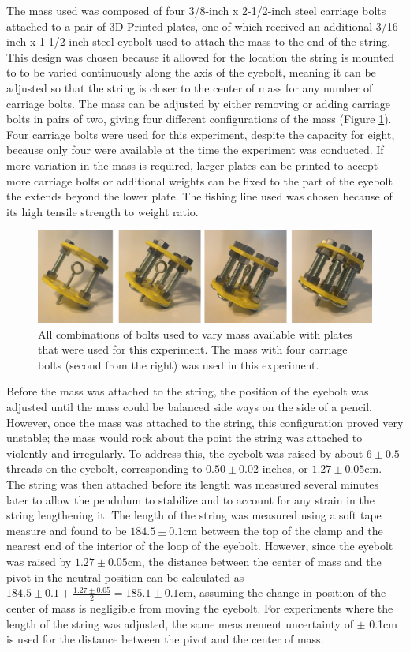 \documentclass[11pt]{article}
\begin{document}
        The mass used was composed of four 3/8-inch x 2-1/2-inch steel carriage bolts attached to a pair of 3D-Printed plates, one of which received an additional 3/16-inch x 1-1/2-inch steel eyebolt used to attach the mass to the end of the string. This design was chosen because it allowed for the location the string is mounted to to be varied continuously along the axis of the eyebolt, meaning it can be adjusted so that the string is closer to the center of mass for any number of carriage bolts. The mass can be adjusted by either removing or adding carriage bolts in pairs of two, giving four different configurations of the mass (Figure \ref{fig:masses}). Four carriage bolts were used for this experiment, despite the capacity for eight, because only four were available at the time the experiment was conducted. If more variation in the mass is required, larger plates can be printed to accept more carriage bolts or additional weights can be fixed to the part of the eyebolt the extends beyond the lower plate. The fishing line used was chosen because of its high tensile strength to weight ratio. 

        \begin{figure}[H]
            \centering\includegraphics[width = 0.75\linewidth]{allMasses.PNG}
            \caption{All combinations of bolts used to vary mass available with plates that were used for this experiment. The mass with four carriage bolts (second from the right) was used in this experiment.}
            \label{fig:masses}
        \end{figure}

        Before the mass was attached to the string, the position of the eyebolt was adjusted until the mass could be balanced side ways on the side of a pencil. However, once the mass was attached to the string, this configuration proved very unstable; the mass would rock about the point the string was attached to violently and irregularly. To address this, the eyebolt was raised by about $6 \pm 0.5$ threads on the eyebolt, corresponding to $0.50 \pm 0.02$ inches, or $1.27 \pm 0.05$cm. The string was then attached before its length was measured several minutes later to allow the pendulum to stabilize and to account for any strain in the string lengthening it. The length of the string was measured using a soft tape measure and found to be $184.5 \pm 0.1$cm between the top of the clamp and the nearest end of the interior of the loop of the eyebolt. However, since the eyebolt was raised by $1.27 \pm 0.05$cm, the distance between the center of mass and the pivot in the neutral position can be calculated as $184.5 \pm 0.1 + \frac{1.27 \pm 0.05}{2} = 185.1 \pm 0.1$cm, assuming the change in position of the center of mass is negligible from moving the eyebolt. For experiments where the length of the string was adjusted, the same measurement uncertainty of $\pm$ 0.1cm is used for the distance between the pivot and the center of mass.
\end{document}
